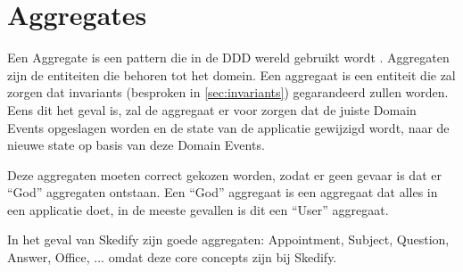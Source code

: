 
\section{Aggregates}
\label{sec:aggregates}

Een Aggregate is een \gls{pattern} die in de \gls{DDD} wereld gebruikt wordt \autocite{FowlerAggregate}. Aggregaten zijn de entiteiten die behoren tot het domein. Een aggregaat is een entiteit die zal zorgen dat invariants (besproken in \ref{sec:invariants}) gegarandeerd zullen worden. Eens dit het geval is, zal de aggregaat er voor zorgen dat de juiste Domain Events opgeslagen worden en de \gls{state} van de applicatie gewijzigd wordt, naar de nieuwe \gls{state} op basis van deze Domain Events.

Deze aggregaten moeten correct gekozen worden, zodat er geen gevaar is dat er ``God'' aggregaten ontstaan. Een ``God'' aggregaat is een aggregaat dat alles in een applicatie doet, in de meeste gevallen is dit een ``User'' aggregaat.

In het geval van Skedify zijn goede aggregaten: Appointment, Subject, Question, Answer, Office, ... omdat deze core concepts zijn bij Skedify.
